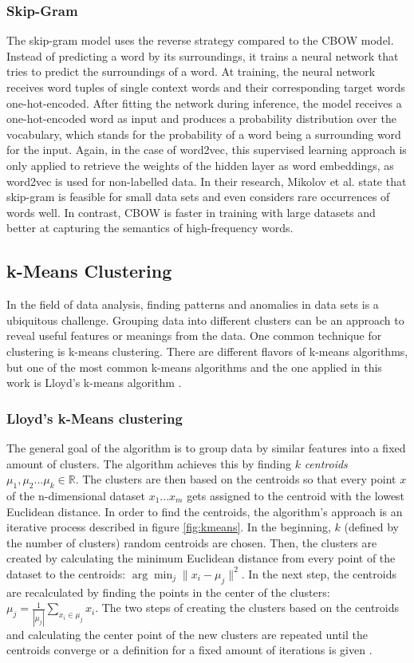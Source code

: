 \documentclass[
    fontsize=12pt,
    headings=small,
    parskip=half,           %
    bibliography=totoc,
    numbers=noenddot,       %
    open=any,               %
    ]{scrreprt}
\begin{document}
\subsubsection{Skip-Gram}
The skip-gram model uses the reverse strategy compared to the CBOW model. Instead of predicting a word by its surroundings, it trains a neural network that tries to predict the surroundings of a word. At training, the neural network receives word tuples of single context words and their corresponding target words one-hot-encoded. After fitting the network during inference, the model receives a one-hot-encoded word as input and produces a probability distribution over the vocabulary, which stands for the probability of a word being a surrounding word for the input. Again, in the case of word2vec, this supervised learning approach is only applied to retrieve the weights of the hidden layer as word embeddings, as word2vec is used for non-labelled data. In their research, Mikolov et al. state that skip-gram is feasible for small data sets and even considers rare occurrences of words well. In contrast, CBOW is faster in training with large datasets and better at capturing the semantics of high-frequency words. 

\subsection{k-Means Clustering}
In the field of data analysis, finding patterns and anomalies in data sets is a ubiquitous challenge. Grouping data into different clusters can be an approach to reveal useful features or meanings from the data. One common technique for clustering is k-means clustering. There are different flavors of k-means algorithms, but one of the most common k-means algorithms and the one applied in this work is Lloyd's k-means algorithm \cite{wilkin2007kmeans}. 
\subsubsection{Lloyd's k-Means clustering}
The general goal of the algorithm is to group data by similar features into a fixed amount of clusters. The algorithm achieves this by finding $k$ \emph{centroids} $\mu_1, \mu_2 ... \mu_k \in \mathbb{R}$. The clusters are then based on the centroids so that every point $x$ of the n-dimensional dataset ${x_1 ... x_m}$ gets assigned to the centroid with the lowest Euclidean distance. In order to find the centroids, the algorithm's approach is an iterative process described in figure \ref{fig:kmeans}. In the beginning, $k$ (defined by the number of clusters) random centroids are chosen. Then, the clusters are created by calculating the minimum Euclidean distance from every point of the dataset to the centroids: $\arg\min_j \|x_i - \mu_j\|^2$. In the next step, the centroids are recalculated by finding the points in the center of the clusters: $\mu_j = \frac{1}{|\mu_j|} \sum_{x_i \in \mu_j} x_i$. The two steps of creating the clusters based on the centroids and calculating the center point of the new clusters are repeated until the centroids converge or a definition for a fixed amount of iterations is given \cite{piech2013kmeans} \cite{lloyd1982kmeans}.
\end{document}
